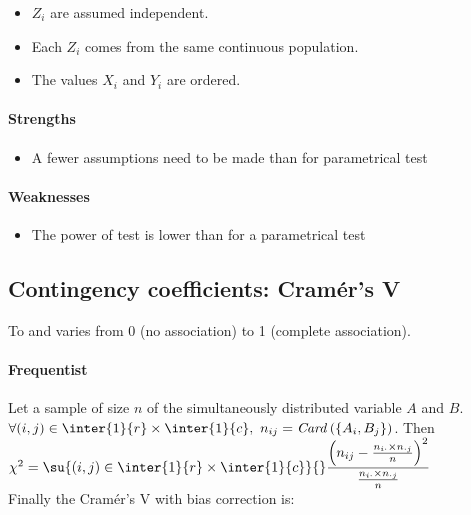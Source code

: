 \begin{itemize}
    \item $Z_{i}$ are assumed independent.
    \item Each $Z_{i}$ comes from the same continuous population.
    \item The values $X_{i}$ and $Y_{i}$ are ordered.
\end{itemize}

\paragraph{Strengths}
\begin{itemize}
    \item A fewer assumptions need to be made than for parametrical test
\end{itemize}

\paragraph{Weaknesses}
\begin{itemize}
    \item The power of test is lower than for a parametrical test
\end{itemize}



\subsection{Contingency coefficients: Cramér's V}
To  and varies from 0 (no association) to 1 (complete association).
\paragraph{Frequentist}
Let a sample of size $n$ of the simultaneously distributed variable $A$ and $B$.
$\forall (i,j)\in\inter{1}{r}\times\inter{1}{c},~n_{ij} = \text{\emph{Card}}\left(
\left\{A_{i},B_{j}\right\}\right)$.
Then $\chi^{2} = \su{(i,j)\in\inter{1}{r}\times\inter{1}{c}}{}\dfrac{\left(n_{ij} - \frac{
n_{i\cdot}\times n_{\cdot j}}{n}\right)^{2}}{\frac{n_{i\cdot}\times n_{\cdot j}}{n}}$\\
Finally the Cramér's V with bias correction is: 
\begin{center}
\end{center}

